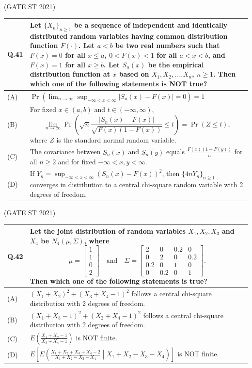 \documentclass[journal,12pt,onecolumn]{IEEEtran}
\theoremstyle{remark}
\begin{document}
\bigskip
\hfill (GATE ST 2021)
\\
\begin{tabular}{|p{1cm}|p{14cm}|}
\hline
\textbf{Q.41} &
Let $\{X_n\}_{n \geq 1}$ be a sequence of independent and identically distributed random variables having common distribution function $F(\cdot)$. Let $a < b$ be two real numbers such that $F(x) = 0$ for all $x \leq a$, $0 < F(x) < 1$ for all $a < x < b$, and $F(x) = 1$ for all $x \geq b$. Let $S_n(x)$ be the empirical distribution function at $x$ based on $X_1, X_2, \ldots, X_n$, $n \geq 1$. Then which one of the following statements is NOT true?\\
\hline
(A) & $\displaystyle \Pr\left(\lim_{n \to \infty} \sup_{-\infty < x < \infty} |S_n(x) - F(x)| = 0 \right) = 1$ \\
\hline
(B) & For fixed $x \in (a,b)$ and $t \in (-\infty, \infty)$,
$$
\lim_{n \to \infty} \Pr\left(\sqrt{n} \frac{|S_n(x) - F(x)|}{\sqrt{F(x)(1 - F(x))}} \leq t\right) = \Pr(Z \leq t), 
$$
    where $Z$ is the standard normal random variable. \\
\hline
(C) & The covariance between $S_n(x)$ and $S_n(y)$ equals $\frac{F(x)(1 - F(y))}{n}$ for all $n \geq 2$ and for fixed $-\infty < x,y < \infty$.\\
\hline
(D) & If $Y_n = \sup_{-\infty < x < \infty} (S_n(x) - F(x))^2$, then $\{4n Y_n\}_{n \geq 1}$ converges in distribution to a central chi-square random variable with 2 degrees of freedom.\\
\hline
\end{tabular}

\bigskip
\hfill (GATE ST 2021)
\\
\begin{tabular}{|p{1cm}|p{14cm}|}
\hline
\textbf{Q.42} &
Let the joint distribution of random variables $X_1, X_2, X_3$ and $X_4$ be $N_4(\mu, \Sigma)$, where
$$
\mu = \begin{bmatrix} 1 \\ 1 \\ 0 \\ 2 \end{bmatrix}
\quad \text{and} \quad
\Sigma =
\begin{bmatrix}
2 & 0 & 0.2 & 0 \\
0 & 2 & 0 & 0.2 \\
0.2 & 0 & 1 & 0 \\
0 & 0.2 & 0 & 1
\end{bmatrix}.
$$
Then which one of the following statements is true?\\
\hline
(A) & $(X_1 + X_2)^2 + (X_3 + X_4 - 1)^2$ follows a central chi-square distribution with 2 degrees of freedom.\\
\hline
(B) & $(X_1 + X_3 - 1)^2 + (X_2 + X_4 - 1)^2$ follows a central chi-square distribution with 2 degrees of freedom.\\
\hline
(C) & $E\left(\frac{X_1 + X_2 - 1}{X_3 + X_4 - 1}\right)$ is NOT finite.\\
\hline
(D) & $E\left[E\left(\frac{X_1 + X_2 + X_3 + X_4 - 2}{X_1 + X_2 - X_3 - X_4} \middle| X_1 + X_2 - X_3 - X_4\right)\right]$ is NOT finite.\\
\hline
\end{tabular}
\end{document}

